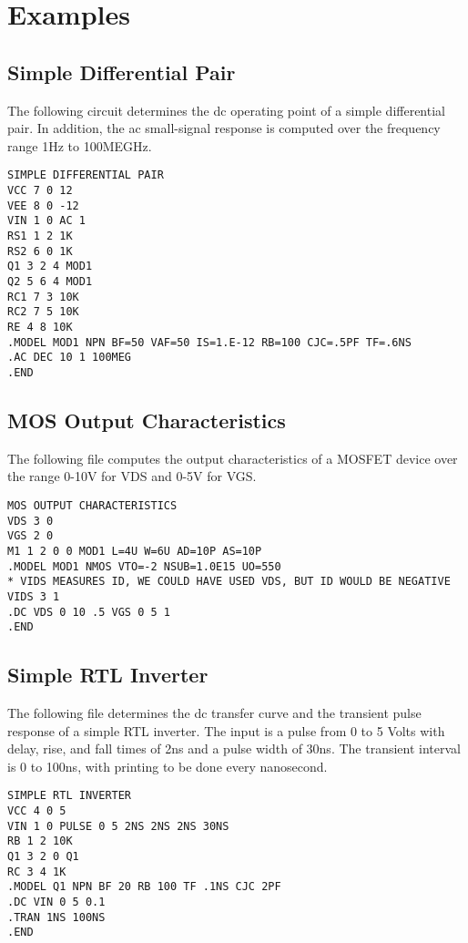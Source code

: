 \chapter{Examples}
{
\raggedbottom

\section{Simple Differential Pair\label{ex:diffpair}}

The following circuit determines the dc operating point
of  a  simple differential pair.  In addition, the ac small-signal
response is computed over the frequency range 1Hz  to
100MEGHz.

\begin{verbatim}
SIMPLE DIFFERENTIAL PAIR
VCC 7 0 12
VEE 8 0 -12
VIN 1 0 AC 1
RS1 1 2 1K
RS2 6 0 1K
Q1 3 2 4 MOD1
Q2 5 6 4 MOD1
RC1 7 3 10K
RC2 7 5 10K
RE 4 8 10K
.MODEL MOD1 NPN BF=50 VAF=50 IS=1.E-12 RB=100 CJC=.5PF TF=.6NS
.AC DEC 10 1 100MEG
.END
\end{verbatim}

\section{MOS Output Characteristics \label{ex:MOS:i/v}}

The following file computes the output  characteristics
of a MOSFET device over the range 0-10V for VDS and 0-5V for
VGS.

\begin{verbatim}
MOS OUTPUT CHARACTERISTICS
VDS 3 0
VGS 2 0
M1 1 2 0 0 MOD1 L=4U W=6U AD=10P AS=10P
.MODEL MOD1 NMOS VTO=-2 NSUB=1.0E15 UO=550
* VIDS MEASURES ID, WE COULD HAVE USED VDS, BUT ID WOULD BE NEGATIVE
VIDS 3 1
.DC VDS 0 10 .5 VGS 0 5 1
.END
\end{verbatim}

\clearpage

\section{Simple RTL Inverter\label{ex:RTLinverter}}

The following file determines the dc transfer curve and
the  transient pulse response of a simple RTL inverter.  The
input is a pulse from 0 to 5 Volts  with  delay,  rise,  and
fall  times of 2ns and a pulse width of 30ns.  The transient
interval is 0 to 100ns,  with  printing  to  be  done  every
nanosecond.

\begin{verbatim}
SIMPLE RTL INVERTER
VCC 4 0 5
VIN 1 0 PULSE 0 5 2NS 2NS 2NS 30NS
RB 1 2 10K
Q1 3 2 0 Q1
RC 3 4 1K
.MODEL Q1 NPN BF 20 RB 100 TF .1NS CJC 2PF
.DC VIN 0 5 0.1
.TRAN 1NS 100NS
.END
\end{verbatim}

}
